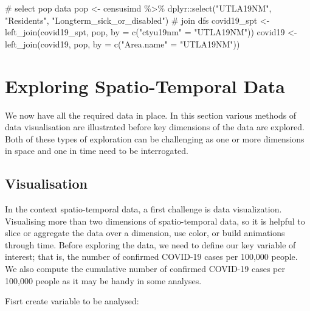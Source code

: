 \documentclass[
  letterpaper,
  krantz2]{style/krantz}
\newenvironment{Shaded}{\begin{snugshade}}{\end{snugshade}}
\newcommand{\AttributeTok}[1]{\textcolor[rgb]{0.40,0.45,0.13}{#1}}
\newcommand{\CommentTok}[1]{\textcolor[rgb]{0.37,0.37,0.37}{#1}}
\newcommand{\FunctionTok}[1]{\textcolor[rgb]{0.28,0.35,0.67}{#1}}
\newcommand{\NormalTok}[1]{\textcolor[rgb]{0.00,0.23,0.31}{#1}}
\newcommand{\OtherTok}[1]{\textcolor[rgb]{0.00,0.23,0.31}{#1}}
\newcommand{\SpecialCharTok}[1]{\textcolor[rgb]{0.37,0.37,0.37}{#1}}
\newcommand{\StringTok}[1]{\textcolor[rgb]{0.13,0.47,0.30}{#1}}
\begin{document}
\begin{Shaded}
\begin{Highlighting}[]
\CommentTok{\# select pop data}
\NormalTok{pop }\OtherTok{\textless{}{-}}\NormalTok{ censusimd }\SpecialCharTok{\%\textgreater{}\%}\NormalTok{ dplyr}\SpecialCharTok{::}\FunctionTok{select}\NormalTok{(}\StringTok{"UTLA19NM"}\NormalTok{, }\StringTok{"Residents"}\NormalTok{, }\StringTok{"Longterm\_sick\_or\_disabled"}\NormalTok{)}
\CommentTok{\# join dfs}
\NormalTok{covid19\_spt }\OtherTok{\textless{}{-}} \FunctionTok{left\_join}\NormalTok{(covid19\_spt, pop,}
                         \AttributeTok{by =} \FunctionTok{c}\NormalTok{(}\StringTok{"ctyu19nm"} \OtherTok{=} \StringTok{"UTLA19NM"}\NormalTok{))}
\NormalTok{covid19 }\OtherTok{\textless{}{-}} \FunctionTok{left\_join}\NormalTok{(covid19, pop, }\AttributeTok{by =} \FunctionTok{c}\NormalTok{(}\StringTok{"Area.name"} \OtherTok{=} \StringTok{"UTLA19NM"}\NormalTok{))}
\end{Highlighting}
\end{Shaded}

\hypertarget{exploring-spatio-temporal-data}{%
\section{Exploring Spatio-Temporal
Data}\label{exploring-spatio-temporal-data}}

We now have all the required data in place. In this section various
methods of data visualisation are illustrated before key dimensions of
the data are explored. Both of these types of exploration can be
challenging as one or more dimensions in space and one in time need to
be interrogated.

\hypertarget{visualisation}{%
\subsection{Visualisation}\label{visualisation}}

In the context spatio-temporal data, a first challenge is data
visualization. Visualising more than two dimensions of spatio-temporal
data, so it is helpful to slice or aggregate the data over a dimension,
use color, or build animations through time. Before exploring the data,
we need to define our key variable of interest; that is, the number of
confirmed COVID-19 cases per 100,000 people. We also compute the
cumulative number of confirmed COVID-19 cases per 100,000 people as it
may be handy in some analyses.

Fisrt create variable to be analysed:
\end{document}
